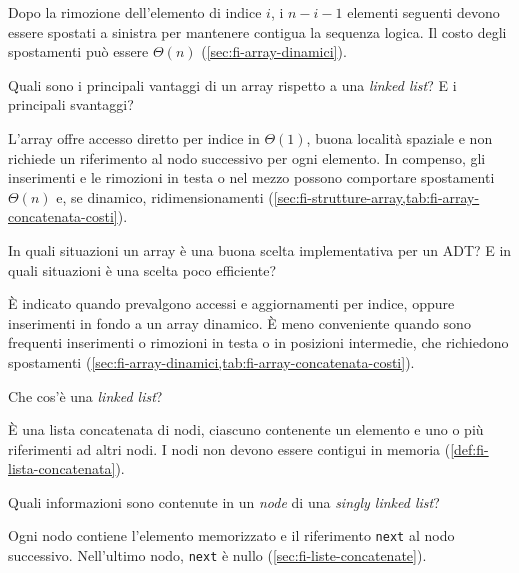 Dopo la rimozione dell'elemento di indice \(i\), i \(n-i-1\) elementi seguenti
devono essere spostati a sinistra per mantenere contigua la sequenza logica. Il
costo degli spostamenti può essere \(\Theta(n)\) (\cref{sec:fi-array-dinamici}).

\begin{exercise}
\label{ex:fi-esercizi-strutture-dati-array-vantaggi-lista}
Quali sono i principali vantaggi di un array rispetto a una \emph{linked list}?
E i principali svantaggi?
\end{exercise}

L'array offre accesso diretto per indice in \(\Theta(1)\), buona località
spaziale e non richiede un riferimento al nodo successivo per ogni elemento. In
compenso, gli inserimenti e le rimozioni in testa o nel mezzo possono comportare
spostamenti \(\Theta(n)\) e, se dinamico, ridimensionamenti
(\cref{sec:fi-strutture-array,tab:fi-array-concatenata-costi}).

\begin{exercise}
\label{ex:fi-esercizi-strutture-dati-quando-usare-array}
In quali situazioni un array è una buona scelta implementativa per un ADT? E in
quali situazioni è una scelta poco efficiente?
\end{exercise}

È indicato quando prevalgono accessi e aggiornamenti per indice, oppure
inserimenti in fondo a un array dinamico. È meno conveniente quando sono
frequenti inserimenti o rimozioni in testa o in posizioni intermedie, che
richiedono spostamenti
(\cref{sec:fi-array-dinamici,tab:fi-array-concatenata-costi}).

\begin{exercise}
\label{ex:fi-esercizi-strutture-dati-linked-list-definizione}
Che cos'è una \emph{linked list}?
\end{exercise}

È una lista concatenata di nodi, ciascuno contenente un elemento e uno o più
riferimenti ad altri nodi. I nodi non devono essere contigui in memoria
(\cref{def:fi-lista-concatenata}).

\begin{exercise}
\label{ex:fi-esercizi-strutture-dati-nodo-singly}
Quali informazioni sono contenute in un \emph{node} di una \emph{singly linked
list}?
\end{exercise}

Ogni nodo contiene l'elemento memorizzato e il riferimento \texttt{next} al nodo
successivo. Nell'ultimo nodo, \texttt{next} è nullo
(\cref{sec:fi-liste-concatenate}).

